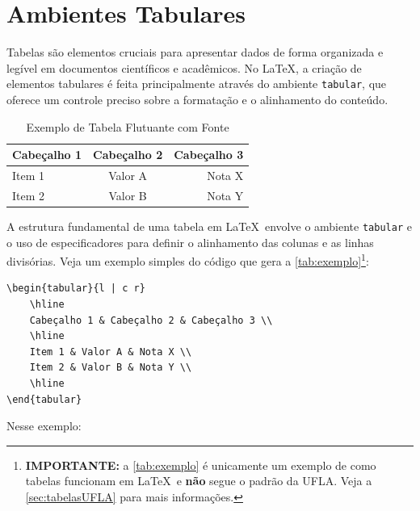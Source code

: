 \section{Ambientes Tabulares}

Tabelas são elementos cruciais para apresentar dados de forma organizada e legível em documentos científicos e acadêmicos. No \LaTeX, a criação de elementos tabulares é feita principalmente através do ambiente \texttt{tabular}, que oferece um controle preciso sobre a formatação e o alinhamento do conteúdo. 

\begin{table}[h!]
	\centering
	\caption{Exemplo de Tabela Flutuante com Fonte}\label{tab:exemplo}
	\begin{tabular}{l | c r}
		\hline
		Cabeçalho 1 & Cabeçalho 2 & Cabeçalho 3 \\
		\hline
		Item 1 & Valor A & Nota X \\
		Item 2 & Valor B & Nota Y \\
		\hline
	\end{tabular}
	\vspace{.3cm}
\end{table}

A estrutura fundamental de uma tabela em \LaTeX\  envolve o ambiente \texttt{tabular} e o uso de especificadores para definir o alinhamento das colunas e as linhas divisórias. Veja um exemplo simples do código que gera a \autoref{tab:exemplo}\footnote
{\textbf{IMPORTANTE:} a \autoref{tab:exemplo} é unicamente um exemplo de como tabelas funcionam em \LaTeX\ e \textbf{não} segue o padrão da UFLA. Veja a \autoref{sec:tabelasUFLA} para mais informações.}:

\begin{lstlisting}[language={[LaTeX]TeX}]
\begin{tabular}{l | c r}
	\hline
	Cabeçalho 1 & Cabeçalho 2 & Cabeçalho 3 \\
	\hline
	Item 1 & Valor A & Nota X \\
	Item 2 & Valor B & Nota Y \\
	\hline
\end{tabular}
\end{lstlisting}
Nesse exemplo:

